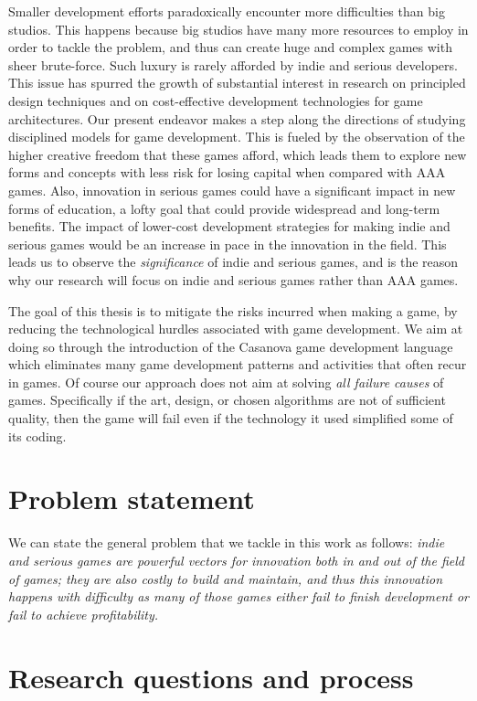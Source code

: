 Smaller development efforts paradoxically encounter more difficulties than big studios. This happens because big studios have many more resources to employ in order to tackle the problem, and thus can create huge and complex games with sheer brute-force. Such luxury is rarely afforded by indie and serious developers. This issue has spurred the growth of substantial interest in research on principled design techniques and on cost-effective development technologies for game architectures. Our present endeavor makes a step along the directions of studying disciplined models for game development. This is fueled by the observation of the higher creative freedom that these games afford, which leads them to explore new forms and concepts with less risk for losing capital when compared with AAA games. Also, innovation in serious games could have a significant impact in new forms of education, a lofty goal that could provide widespread and long-term benefits. The impact of lower-cost development strategies for making indie and serious games would be an increase in pace in the innovation in the field. This leads us to observe the \textit{significance} of indie and serious games, and is the reason why our research will focus on indie and serious games rather than AAA games.

The goal of this thesis is to mitigate the risks incurred when making a game, by reducing the technological hurdles associated with game development. We aim at doing so through the introduction of the Casanova game development language which eliminates many game development patterns and activities that often recur in games. Of course our approach does not aim at solving \textit{all failure causes} of games. Specifically if the art, design, or chosen algorithms are not of sufficient quality, then the game will fail even if the technology it used simplified some of its coding.

\section{Problem statement}

We can state the general problem that we tackle in this work as follows: \textit{indie and serious games are powerful vectors for innovation both in and out of the field of games; they are also costly to build and maintain, and thus this innovation happens with difficulty as many of those games either fail to finish development or fail to achieve profitability.}


\section{Research questions and process}

